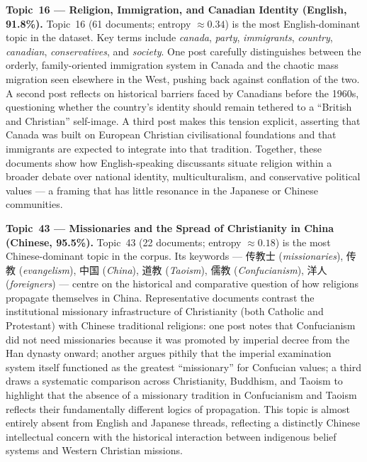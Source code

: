 \documentclass[../CLthesis.tex]{subfiles}
\begin{document}
\textbf{Topic~16 --- Religion, Immigration, and Canadian Identity (English, 91.8\%).}
Topic~16 (61 documents; entropy $\approx 0.34$) is the most English-dominant topic in the dataset. Key terms include \textit{canada}, \textit{party}, \textit{immigrants}, \textit{country}, \textit{canadian}, \textit{conservatives}, and \textit{society}. One post carefully distinguishes between the orderly, family-oriented immigration system in Canada and the chaotic mass migration seen elsewhere in the West, pushing back against conflation of the two. A second post reflects on historical barriers faced by Canadians before the 1960s, questioning whether the country's identity should remain tethered to a ``British and Christian'' self-image. A third post makes this tension explicit, asserting that Canada was built on European Christian civilisational foundations and that immigrants are expected to integrate into that tradition. Together, these documents show how English-speaking discussants situate religion within a broader debate over national identity, multiculturalism, and conservative political values --- a framing that has little resonance in the Japanese or Chinese communities.

\textbf{Topic~43 --- Missionaries and the Spread of Christianity in China (Chinese, 95.5\%).}
Topic~43 (22 documents; entropy $\approx 0.18$) is the most Chinese-dominant topic in the corpus. Its keywords --- 传教士 (\textit{missionaries}), 传教 (\textit{evangelism}), 中国 (\textit{China}), 道教 (\textit{Taoism}), 儒教 (\textit{Confucianism}), 洋人 (\textit{foreigners}) --- centre on the historical and comparative question of how religions propagate themselves in China. Representative documents contrast the institutional missionary infrastructure of Christianity (both Catholic and Protestant) with Chinese traditional religions: one post notes that Confucianism did not need missionaries because it was promoted by imperial decree from the Han dynasty onward; another argues pithily that the imperial examination system itself functioned as the greatest ``missionary'' for Confucian values; a third draws a systematic comparison across Christianity, Buddhism, and Taoism to highlight that the absence of a missionary tradition in Confucianism and Taoism reflects their fundamentally different logics of propagation. This topic is almost entirely absent from English and Japanese threads, reflecting a distinctly Chinese intellectual concern with the historical interaction between indigenous belief systems and Western Christian missions.
\end{document}
